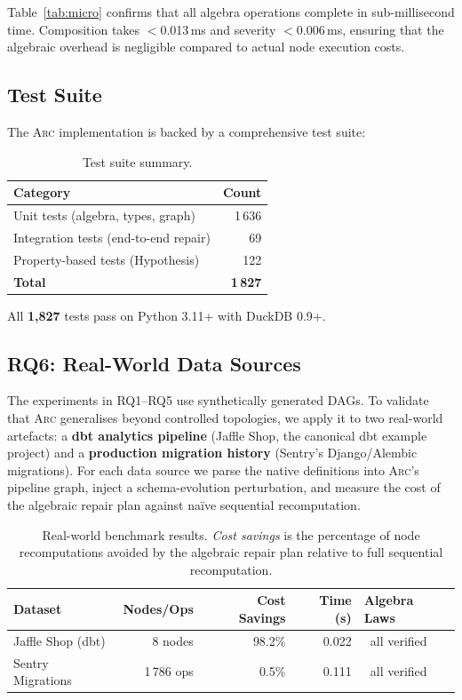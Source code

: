 \documentclass[sigplan,screen,nonacm]{acmart}
\newcommand{\cmark}{\ding{51}}
\newcommand{\arc}{\textsc{Arc}\xspace}
\begin{document}
Table~\ref{tab:micro} confirms that all algebra operations complete in
sub-millisecond time.  Composition takes $<$0.013\,ms and severity
$<$0.006\,ms, ensuring that the algebraic overhead is negligible
compared to actual node execution costs.

\subsection{Test Suite}

The \arc implementation is backed by a comprehensive test suite:

\begin{table}[t]
\caption{Test suite summary.}
\label{tab:tests}
\centering\small
\begin{tabular}{@{}lr@{}}
\toprule
\textbf{Category} & \textbf{Count} \\
\midrule
Unit tests (algebra, types, graph)    & 1\,636 \\
Integration tests (end-to-end repair) & 69 \\
Property-based tests (Hypothesis)     & 122 \\
\midrule
\textbf{Total}                        & \textbf{1\,827} \\
\bottomrule
\end{tabular}
\end{table}

All \textbf{1,827} tests pass on Python 3.11+ with DuckDB 0.9+.

\subsection{RQ6: Real-World Data Sources}

The experiments in RQ1--RQ5 use synthetically generated DAGs.  To
validate that \arc generalises beyond controlled topologies, we apply it
to two real-world artefacts: a \textbf{dbt analytics pipeline}
(Jaffle Shop, the canonical dbt example project) and a
\textbf{production migration history} (Sentry's Django/Alembic
migrations).  For each data source we parse the native definitions into
\arc's pipeline graph, inject a schema-evolution perturbation, and
measure the cost of the algebraic repair plan against na\"{i}ve
sequential recomputation.

\begin{table}[t]
  \centering
  \caption{Real-world benchmark results.  \emph{Cost savings} is
    the percentage of node recomputations avoided by the algebraic
    repair plan relative to full sequential recomputation.}
  \label{tab:real-benchmarks}
  \begin{tabular}{@{}lrrrl@{}}
    \toprule
    \textbf{Dataset} & \textbf{Nodes/Ops} & \textbf{Cost Savings} & \textbf{Time (s)} & \textbf{Algebra Laws} \\
    \midrule
    Jaffle Shop (dbt)      &   8 nodes &  98.2\% & 0.022 & \cmark\ all verified \\
    Sentry Migrations      & 1\,786 ops &   0.5\% & 0.111 & \cmark\ all verified \\
    \bottomrule
  \end{tabular}
\end{table}
\end{document}
